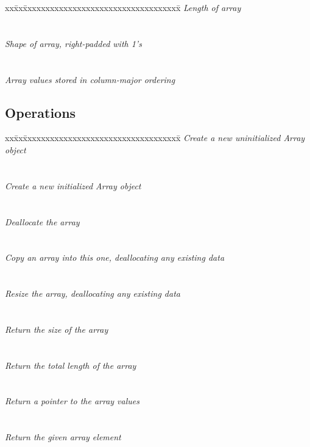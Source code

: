 \begin{tabbing}
xx\=xx\=xxxxxxxxxxxxxxxxxxxxxxxxxxxxxxxxxxx\= \kill
\> \todo \>  \textit{Length of array} \\
\>       \>       \\ \\
\> \todo \>  \textit {Shape of array, right-padded with 1's} \\
\>       \>   \\ \\
\> \todo \>  \textit {Array values stored in column-major ordering}\\
\>       \> 
\end{tabbing}

\subsection{Operations}

\begin{tabbing}
xx\=xx\=xxxxxxxxxxxxxxxxxxxxxxxxxxxxxxxxxxx\= \kill
\> \todo \> \textit{Create a new uninitialized Array object} \\
\>       \>  \\ \\
\> \todo \> \textit{Create a new initialized Array object} \\
\>       \>  \\ \\
\> \todo \> \textit{Deallocate the array} \\
\>       \>   \\ \\
\> \todo \> \textit{Copy an array into this one, deallocating any existing data} \\
\>       \>   \\ \\
\> \todo \> \textit{Resize the array, deallocating any existing data} \\
\>       \>    \\ \\
\> \todo \> \textit{Return the size of the array} \\
\>       \>   \\ \\
\> \todo \> \textit{Return the total length of the array} \\
\>       \>   \\ \\
\> \todo \> \textit{Return a pointer to the array values} \\
\>       \>   \\ \\
\> \todo \> \textit{Return the given array element} \\
\>       \> 
\end{tabbing}


